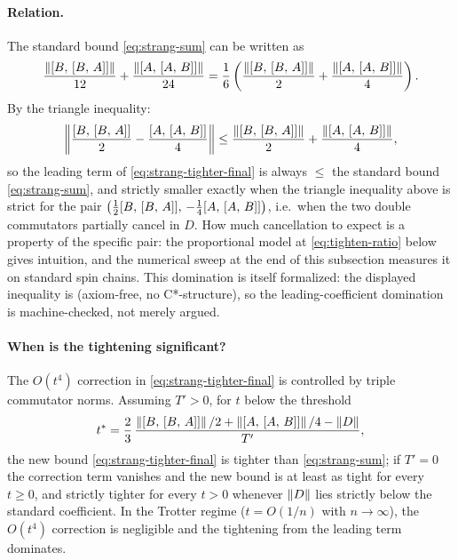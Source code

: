 \paragraph{Relation.}
The standard bound \eqref{eq:strang-sum} can be written as
\[
  \frac{\left\|[B,\,[B,\,A]]\right\|}{12}
  + \frac{\left\|[A,\,[A,\,B]]\right\|}{24}
  = \frac{1}{6}\left(
    \frac{\left\|[B,\,[B,\,A]]\right\|}{2}
    + \frac{\left\|[A,\,[A,\,B]]\right\|}{4}
    \right).
\]
By the triangle inequality:
\[
  \left\|\frac{[B,\,[B,\,A]]}{2}
    - \frac{[A,\,[A,\,B]]}{4}\right\|
  \le
  \frac{\left\|[B,\,[B,\,A]]\right\|}{2}
    + \frac{\left\|[A,\,[A,\,B]]\right\|}{4},
\]
so the leading term of \eqref{eq:strang-tighter-final} is always
$\le$ the standard bound \eqref{eq:strang-sum}, and strictly smaller exactly
when the triangle inequality above is strict for the pair
$\bigl(\tfrac12[B,\,[B,\,A]],\, -\tfrac14[A,\,[A,\,B]]\bigr)$,
i.e.\ when the two double commutators partially cancel in $D$. How much
cancellation to expect is a property of the specific pair: the proportional
model at \cref{eq:tighten-ratio} below gives intuition, and the numerical
sweep at the end of this subsection measures it on standard spin chains.
This domination is itself
formalized: the displayed inequality is
(axiom-free, no C*-structure), so the leading-coefficient domination is
machine-checked, not merely argued.

\paragraph{When is the tightening significant?}
The $O(t^4)$ correction in \eqref{eq:strang-tighter-final} is controlled
by triple commutator norms. Assuming $T' > 0$, for $t$ below the threshold
\[
  t^* = \frac{2}{3}\,
  \frac{\left\|[B,\,[B,\,A]]\right\|/2 + \left\|[A,\,[A,\,B]]\right\|/4
    - \left\|D\right\|}{T'},
\]
the new bound \eqref{eq:strang-tighter-final} is tighter than
\eqref{eq:strang-sum}; if $T' = 0$ the correction term vanishes and the new
bound is at least as tight for every $t \ge 0$, and strictly tighter for
every $t > 0$ whenever
$\left\|D\right\|$ lies strictly below the standard coefficient. In the Trotter
regime ($t = O(1/n)$ with
$n \to \infty$), the $O(t^4)$ correction is negligible and the tightening
from the leading term dominates.

